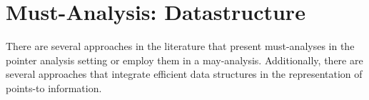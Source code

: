 



\section{Must-Analysis: Datastructure}

There are several approaches in the literature that present
must-analyses in the pointer analysis setting or employ them in a
may-analysis. Additionally, there are several approaches that
integrate efficient data structures in the representation of
points-to information.


